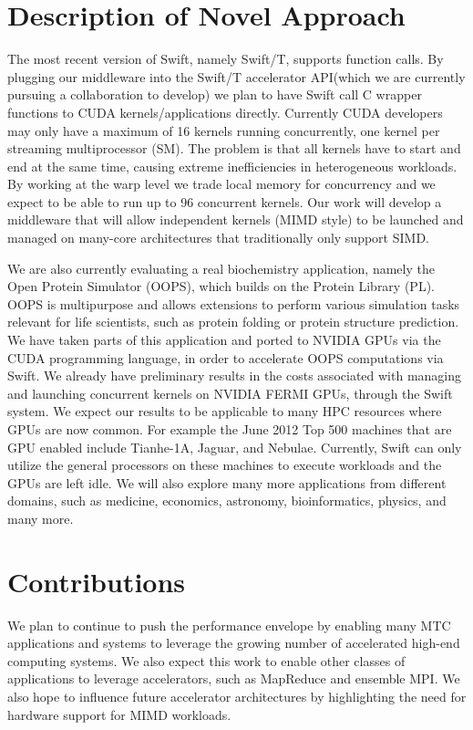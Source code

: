 \documentclass[conference]{IEEEtran}
\begin{document}
\section{Description of Novel Approach}
The most recent version of Swift, namely Swift/T, supports function calls.\cite{wozniak13swift} By plugging our middleware into the Swift/T accelerator API(which we are currently pursuing a collaboration to develop) we plan to have Swift call C wrapper functions to CUDA kernels/applications directly. Currently CUDA developers may only have a maximum of 16 kernels running concurrently, one kernel per streaming multiprocessor (SM). The problem is that all kernels have to start and end at the same time, causing extreme inefficiencies in heterogeneous workloads. By working at the warp level we trade local memory for concurrency and we expect to be able to run up to 96 concurrent kernels. Our work will develop a middleware that will allow independent kernels (MIMD style) to be launched and managed on many-core architectures that traditionally only support SIMD. \cite{kriederXSEDE12}

We are also currently evaluating a real biochemistry application, namely the Open Protein Simulator (OOPS), which builds on the Protein Library (PL). OOPS is multipurpose and allows extensions to perform various simulation tasks relevant for life scientists, such as protein folding or protein structure prediction.\cite{OOPS} We have taken parts of this application and ported to NVIDIA GPUs via the CUDA programming language, in order to accelerate OOPS computations via Swift. We already have preliminary results in the costs associated with managing and launching concurrent kernels on NVIDIA FERMI GPUs, through the Swift system. We expect our results to be applicable to many HPC resources where GPUs are now common. For example the June 2012 Top 500 machines that are GPU enabled include Tianhe-1A, Jaguar, and Nebulae. Currently, Swift can only utilize the general processors on these machines to execute workloads and the GPUs are left idle. We will also explore many more applications from different domains, such as medicine, economics, astronomy, bioinformatics, physics, and many more.
\section{Contributions}
We plan to continue to push the performance envelope by enabling many MTC applications and systems to leverage the growing number of accelerated high-end computing systems. We also expect this work to enable other classes of applications to leverage accelerators, such as MapReduce and ensemble MPI. We also hope to influence future accelerator architectures by highlighting the need for hardware support for MIMD workloads.



\end{document}
